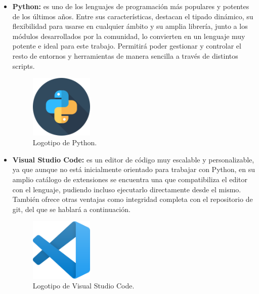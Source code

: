 \begin{itemize}
    \item \textbf{Python:} es uno de los lenguajes de programación más populares y potentes de los últimos años. Entre sus características, destacan el tipado dinámico, su flexibilidad para usarse en cualquier ámbito y su amplia librería\cite{cap3_4}, junto a los módulos desarrollados por la comunidad, lo convierten en un lenguaje muy potente e ideal para este trabajo. Permitirá poder gestionar y controlar el resto de entornos y herramientas de manera sencilla a través de distintos scripts.
    \begin{figure}[h]
        \centering
        \includegraphics[width=3cm]{imagenes/capitulo3/pythonLogo.png}
        \caption{Logotipo de Python.}
        \label{fig:python_logo}
    \end{figure}

    \item \textbf{Visual Studio Code: } es un editor de código muy escalable y personalizable, ya que aunque no está inicialmente orientado para trabajar con Python, en su amplio catálogo de extensiones se encuentra una que compatibiliza el editor con el lenguaje, pudiendo incluso ejecutarlo directamente desde el mismo\cite{cap3_5}. También ofrece otras ventajas como integridad completa con el repositorio de git, del que se hablará a continuación.
    \begin{figure}[h]
        \centering
        \includegraphics[width=3cm]{imagenes/capitulo3/VisualStudioLogo.png}
        \caption{Logotipo de Visual Studio Code.}
        \label{fig:visualStudioCode_interfaces}
    \end{figure}


\end{itemize}
